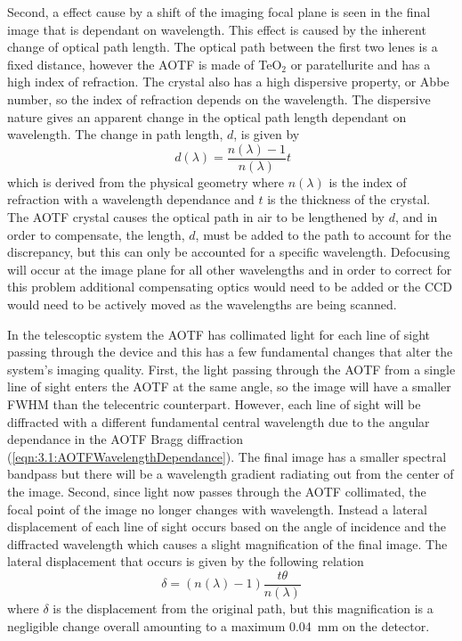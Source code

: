 \documentclass[12pt]{article}
\begin{document}
Second, a effect cause by a shift of the imaging focal plane is seen in the final image that is dependant on wavelength. This effect is caused by the inherent change of optical path length. The optical path between the first two lenes is a fixed distance, however the AOTF is made of TeO$_{2}$ or paratellurite and has a high index of refraction. The crystal also has a high dispersive property, or Abbe number, so the index of refraction depends on the wavelength. The dispersive nature gives an apparent change in the optical path length dependant on wavelength. The change in path length, $d$, is given by
\begin{equation}
    \ d(\lambda) = \frac{n(\lambda)-1}{n(\lambda)}t
    \label{eqn:3.2:opticalPathDisplacement}
\end{equation}
which is derived from the physical geometry where $n(\lambda)$ is the index of refraction with a wavelength dependance and $t$ is the thickness of the crystal. The AOTF crystal causes the optical path in air to be lengthened by $d$, and in order to compensate, the length, $d$, must be added to the path to account for the discrepancy, but this can only be accounted for a specific wavelength. Defocusing will occur at the image plane for all other wavelengths and in order to correct for this problem additional compensating optics would need to be added or the CCD would need to be actively moved as the wavelengths are being scanned.

In the telescoptic system the AOTF has collimated light for each line of sight passing through the device and this has a few fundamental changes that alter the system's imaging quality. First, the light passing through the AOTF from a single line of sight enters the AOTF at the same angle, so the image will have a smaller FWHM than the telecentric counterpart. However, each line of sight will be diffracted with a different fundamental central wavelength due to the angular dependance in the AOTF Bragg diffraction (\autoref{eqn:3.1:AOTFWavelengthDependance}). The final image has a smaller spectral bandpass but there will be a wavelength gradient radiating out from the center of the image. Second, since light now passes through the AOTF collimated, the focal point of the image no longer changes with wavelength. Instead a lateral displacement of each line of sight occurs based on the angle of incidence and the diffracted wavelength which causes a slight magnification of the final image. The lateral displacement that occurs is given by the following relation
\begin{equation}
    \delta = (n(\lambda)-1)\frac{t\theta}{n(\lambda)}
    \label{eqn:3.2:planeParallelDiplacement}
\end{equation}
where $\delta$ is the displacement from the original path, but this magnification is a negligible change overall amounting to a maximum 0.04~mm on the detector.
\end{document}
